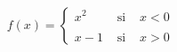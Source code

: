 \documentclass{article} %
\begin{document}
\[
f(x)= \left\{ \begin{array}{lcl}
x^2 & \mbox{ si } & x<0 \\
& & \\
x-1 & \mbox{ si } & x>0
\end{array}
\right.
\]
\end{document}
